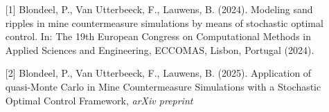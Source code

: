 \begin{talk}
\medskip
\begin{enumerate}
	\item[{[1]}] Blondeel, P., Van Utterbeeck, F., Lauwens, B. (2024). Modeling sand ripples in mine countermeasure simulations by means of stochastic optimal control. In: The 19th European Congress on Computational Methods in Applied Sciences and Engineering, ECCOMAS, Lisbon, Portugal (2024).
	\item[{[2]}] Blondeel, P., Van Utterbeeck, F., Lauwens, B. (2025).  Application of quasi-Monte Carlo in Mine Countermeasure Simulations with a Stochastic Optimal Control Framework, \textit{arXiv preprint}
\end{enumerate}

\end{talk}
